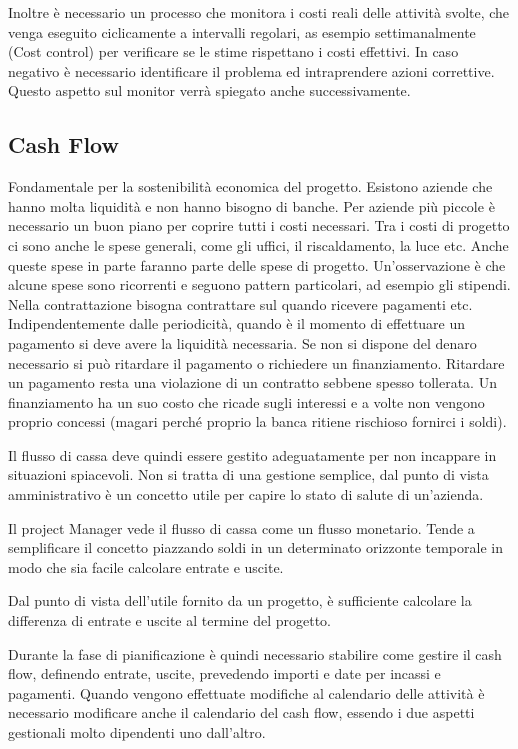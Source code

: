 \noindent Inoltre è necessario un processo che monitora i costi reali delle attività svolte, che venga eseguito ciclicamente a intervalli regolari, as esempio settimanalmente (Cost control) per verificare se le stime rispettano i costi effettivi. In caso negativo è necessario identificare il problema ed intraprendere azioni correttive. Questo aspetto sul monitor verrà spiegato anche successivamente.
\subsection{Cash Flow}
Fondamentale per la sostenibilità economica del progetto. Esistono aziende che hanno molta liquidità e non hanno bisogno di banche. Per aziende più piccole è necessario un buon piano per coprire tutti i costi necessari. Tra i costi di progetto ci sono anche le spese generali, come gli uffici, il riscaldamento, la luce etc.
Anche queste spese in parte faranno parte delle spese di progetto. Un'osservazione è che alcune spese sono ricorrenti e seguono pattern particolari, ad esempio gli stipendi. Nella contrattazione bisogna contrattare sul quando ricevere pagamenti etc.
Indipendentemente dalle periodicità, quando è il momento di effettuare un pagamento si deve avere la liquidità necessaria. Se non si dispone del denaro necessario si può ritardare il pagamento o richiedere un finanziamento. Ritardare un pagamento resta una violazione di un contratto sebbene spesso tollerata. Un finanziamento ha un suo costo che ricade sugli interessi e a volte non vengono proprio concessi (magari perché proprio la banca ritiene rischioso fornirci i soldi).

\noindent Il flusso di cassa deve quindi essere gestito adeguatamente per non incappare in situazioni spiacevoli. Non si tratta di una gestione semplice, dal punto di vista amministrativo è un concetto utile per capire lo stato di salute di un'azienda.

\noindent Il project Manager vede il flusso di cassa come un flusso monetario. Tende a semplificare il concetto piazzando soldi in un determinato orizzonte temporale in modo che sia facile calcolare entrate e uscite.

\noindent Dal punto di vista dell'utile fornito da un progetto, è sufficiente calcolare la differenza di entrate e uscite al termine del progetto.

\noindent Durante la fase di pianificazione è quindi necessario stabilire come gestire il cash flow, definendo entrate, uscite, prevedendo importi e date per incassi e pagamenti. Quando vengono effettuate modifiche al calendario delle attività è necessario modificare anche il calendario del cash flow, essendo i due aspetti gestionali molto dipendenti uno dall'altro.

